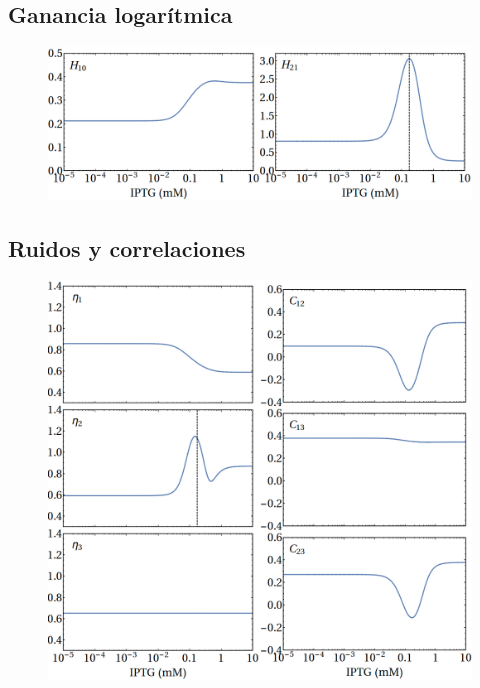 \documentclass[xcolor=dvipsnames]{beamer}
\begin{document}

\subsection{Ganancia logar\'itmica}
\begin{frame}
\begin{figure}[p]
    \centering
    \includegraphics[width=\textwidth]{lan-Hs.png}\\
\end{figure}
\end{frame}

\subsection{Ruidos y correlaciones}
\begin{frame}
\begin{figure}[p]
    \centering
    \includegraphics[width=.7\textwidth]{lan-noise_corr_full.png}\\
\end{figure}
\end{frame}
\end{document}
